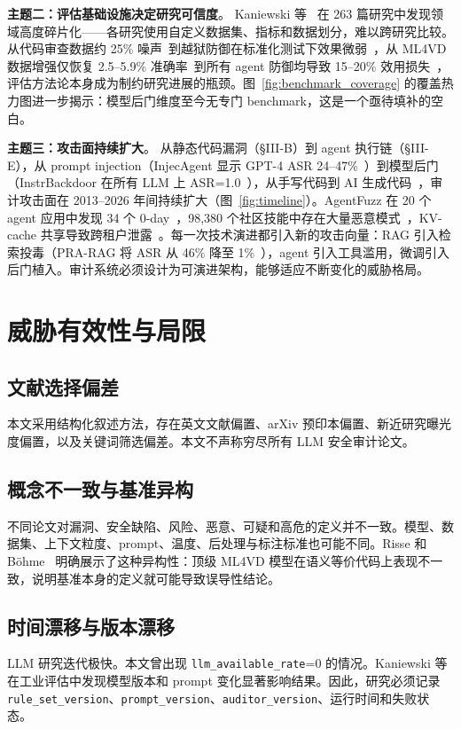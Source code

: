 \documentclass[11pt,a4paper,onecolumn]{article}
\newcommand{\risk}[1]{\texttt{#1}}
\begin{document}
\textbf{主题二：评估基础设施决定研究可信度}。
Kaniewski 等~\cite{kaniewski2026detecting} 在 263 篇研究中发现领域高度碎片化——各研究使用自定义数据集、指标和数据划分，难以跨研究比较。从代码审查数据约 25\% 噪声~\cite{tufano_2024_strengths_weaknesses}到越狱防御在标准化测试下效果微弱~\cite{chao2024jailbreakbench}，从 ML4VD 数据增强仅恢复 2.5--5.9\% 准确率~\cite{risse2024limits}到所有 agent 防御均导致 15--20\% 效用损失~\cite{debenedetti2024agentdojo}，评估方法论本身成为制约研究进展的瓶颈。图~\ref{fig:benchmark_coverage} 的覆盖热力图进一步揭示：模型后门维度至今无专门 benchmark，这是一个亟待填补的空白。

\textbf{主题三：攻击面持续扩大}。
从静态代码漏洞（§III-B）到 agent 执行链（§III-E），从 prompt injection（InjecAgent 显示 GPT-4 ASR 24--47\%~\cite{zhan2024injecagent}）到模型后门（InstrBackdoor 在所有 LLM 上 ASR=1.0~\cite{zhang2024instrbackdoor}），从手写代码到 AI 生成代码~\cite{pearce2023copilot_correctness}，审计攻击面在 2013--2026 年间持续扩大（图~\ref{fig:timeline}）。AgentFuzz 在 20 个 agent 应用中发现 34 个 0-day~\cite{liu2025taintstyle}，98,380 个社区技能中存在大量恶意模式~\cite{liu2026malskills}，KV-cache 共享导致跨租户泄露~\cite{wu2025promptleakage}。每一次技术演进都引入新的攻击向量：RAG 引入检索投毒（PRA-RAG 将 ASR 从 46\% 降至 1\%~\cite{tan2026prarag}），agent 引入工具滥用，微调引入后门植入。审计系统必须设计为可演进架构，能够适应不断变化的威胁格局。

\section{威胁有效性与局限}

\subsection{文献选择偏差}
本文采用结构化叙述方法，存在英文文献偏置、arXiv 预印本偏置、新近研究曝光度偏置，以及关键词筛选偏差。本文不声称穷尽所有 LLM 安全审计论文。

\subsection{概念不一致与基准异构}
不同论文对漏洞、安全缺陷、风险、恶意、可疑和高危的定义并不一致。模型、数据集、上下文粒度、prompt、温度、后处理与标注标准也可能不同。Risse 和 Böhme~\cite{risse2024limits} 明确展示了这种异构性：顶级 ML4VD 模型在语义等价代码上表现不一致，说明基准本身的定义就可能导致误导性结论。

\subsection{时间漂移与版本漂移}
LLM 研究迭代极快。本文曾出现 \risk{llm\_available\_rate}=0 的情况。Kaniewski 等~\cite{kaniewski2026detecting} 在工业评估中发现模型版本和 prompt 变化显著影响结果。因此，研究必须记录 \risk{rule\_set\_version}、\risk{prompt\_version}、\risk{auditor\_version}、运行时间和失败状态。
\end{document}

